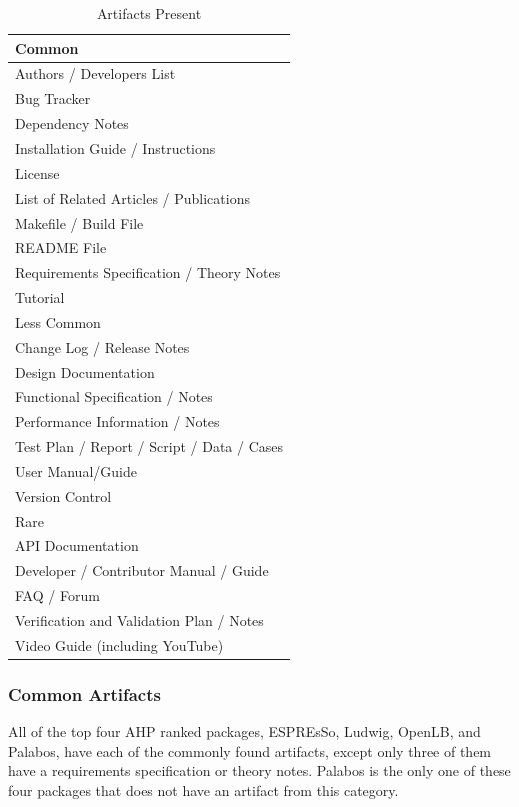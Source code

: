 \documentclass[final, 3p, times, authoryear]{elsarticle}
\begin{document}
\begin{table}
	\begin{center}
		\begin{tabular}{ p{8 cm} }
			\hline
			Common\\
			\hline
			Authors / Developers List\\
			Bug Tracker\\
			Dependency Notes\\
			Installation Guide / Instructions\\
			License\\
			List of Related Articles / Publications\\
			Makefile / Build File\\
			README File\\
			Requirements Specification / Theory Notes\\
			Tutorial\\
			\hline
			Less Common\\
			\hline
			Change Log / Release Notes\\
			Design Documentation\\
			Functional Specification / Notes\\
			Performance Information / Notes\\
			Test Plan / Report / Script / Data / Cases\\
			User Manual/Guide\\
			Version Control\\
			\hline
			Rare\\
			\hline
			API Documentation\\
			Developer / Contributor Manual / Guide\\
			FAQ / Forum\\
			Verification and Validation Plan / Notes\\
			Video Guide (including YouTube)\\
			\hline
		\end{tabular}
		\caption{Artifacts Present} \label{artifactspresent}
	\end{center}
\end{table}

\subsubsection{Common Artifacts}

All of the top four AHP ranked packages, ESPREsSo, Ludwig, OpenLB, and Palabos,
have each of the commonly found artifacts, except only three of them have a
requirements specification or theory notes. Palabos is the only one of these
four packages that does not have an artifact from this category.
\end{document}
